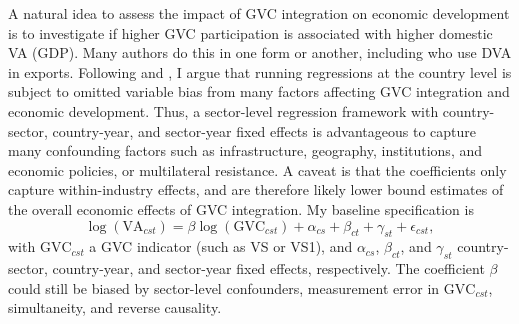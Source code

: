\documentclass[a4paper]{article}
\begin{document}
A natural idea to assess the impact of GVC integration on economic development is to investigate if higher GVC participation is associated with higher domestic VA (GDP). Many authors do this in one form or another, including \citet{lwesya2022integration} who use DVA in exports. Following \citet{Kummritz20161} and \citet{rodriguez2000trade}, I argue that running regressions at the country level is subject to omitted variable bias from many factors affecting GVC integration and economic development. Thus, a sector-level regression framework with country-sector, country-year, and sector-year fixed effects is advantageous to capture many confounding factors such as infrastructure, geography, institutions, and economic policies, or multilateral resistance. A caveat is that the coefficients only capture within-industry effects, and are therefore likely lower bound estimates of the overall economic effects of GVC integration. My baseline specification is 
%
\begin{equation} \label{eq:VA_HDFE}
\log(\text{VA}_{cst}) = \beta \log(\text{GVC}_{cst}) + \alpha_{cs} + \beta_{ct} +\gamma_{st} + \epsilon_{cst},
\end{equation}
%
with $\text{GVC}_{cst}$ a GVC indicator (such as VS or VS1), and $\alpha_{cs}$, $\beta_{ct}$, and $\gamma_{st}$ country-sector, country-year, and sector-year fixed effects, respectively. The coefficient $\beta$ could still be biased by sector-level confounders, measurement error in $\text{GVC}_{cst}$, simultaneity, and reverse causality.  \newline
\end{document}
